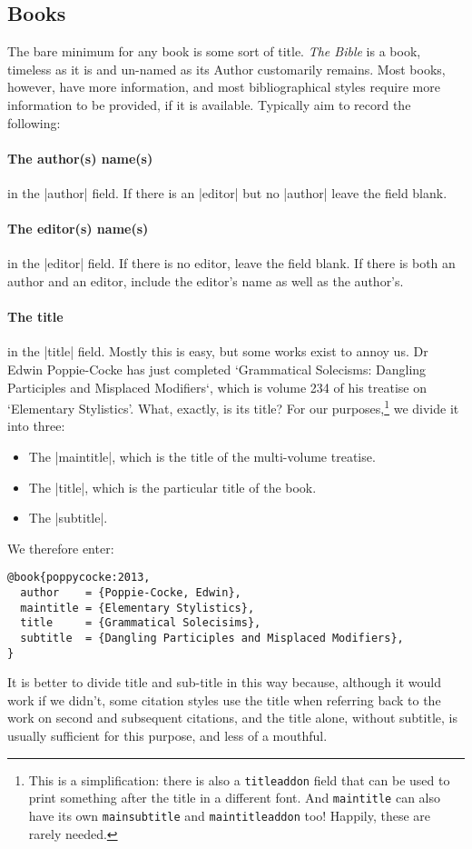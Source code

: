 \subsection{Books}

The bare minimum for any book is some sort of title. \emph{The Bible}
is a book, timeless as it is and un-named as its Author customarily
remains. Most books, however, have more information, and most
bibliographical styles require more information to be provided, if it
is available. Typically aim to record the following:

\paragraph{The author(s) name(s)} in the |author| field. If there is
an |editor| but no |author| leave the field blank.

\paragraph{The editor(s) name(s)} in the |editor| field. If there is
no editor, leave the field blank. If there is both an author and an
editor, include the editor's name as well as the author's.

\paragraph{The title} in the |title| field. Mostly this is easy, but
some works exist to annoy us. Dr Edwin Poppie-Cocke has just completed
`Grammatical Solecisms: Dangling Participles and Misplaced Modifiers`,
which is volume 234 of his treatise on `Elementary Stylistics'. What,
exactly, is its title? For our purposes,\footnote{This is a
  simplification: there is also a \texttt{titleaddon} field that can
  be used to print something after the title in a different font. And
  \texttt{maintitle} can also have its own \texttt{mainsubtitle} and
  \texttt{maintitleaddon} too! Happily, these are rarely needed.} we
divide it into three:
\begin{itemize}
\item The |maintitle|, which is the title of the multi-volume
  treatise.
\item The |title|, which is the particular title of the book.
\item The |subtitle|.
\end{itemize}
We therefore enter:
\begin{Verbatim}
@book{poppycocke:2013,
  author    = {Poppie-Cocke, Edwin},
  maintitle = {Elementary Stylistics},
  title     = {Grammatical Solecisims},
  subtitle  = {Dangling Participles and Misplaced Modifiers},
}
\end{Verbatim}
It is better to divide title and sub-title in this way because,
although it would work if we didn't, some citation styles use the
title when referring back to the work on second and subsequent
citations, and the title alone, without subtitle, is usually
sufficient for this purpose, and less of a mouthful.

